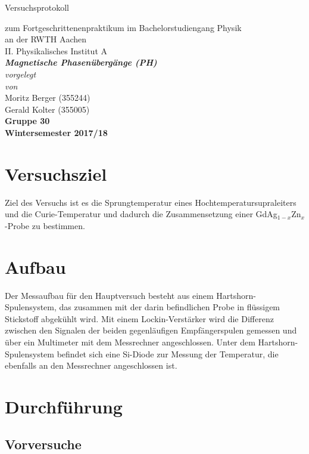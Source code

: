 \documentclass[12pt,a4paper]{article}
\author{Gerald}
\begin{document}
	\setlength{\parindent}{0pt} 
	\begin{center}
		{\LARGE Versuchsprotokoll}\\
		\begin{large}
			zum Fortgeschrittenenpraktikum im Bachelorstudiengang Physik\\[0.4cm]
			an der RWTH Aachen\\
			II. Physikalisches Institut A\\[5.5cm]
			\Large\textbf{\textsl{Magnetische Phasenübergänge (PH)}}\\[5.5cm]
			\normalsize\textit{vorgelegt\\von}\\[0.4cm]
			\large{Moritz Berger (355244)\\Gerald Kolter (355005)}\\\textbf{Gruppe 30}\\[2cm]
			\large \textbf{Wintersemester 2017/18}
		\end{large}
	\end{center}
	\newpage
	
	\tableofcontents
	\newpage

\section{Versuchsziel}
Ziel des Versuchs ist es die Sprungtemperatur eines Hochtemperatursupraleiters und die Curie-Temperatur und dadurch die Zusammensetzung einer GdAg$_{1-x}$Zn$_x$-Probe zu bestimmen.

\section{Aufbau}
Der Messaufbau für den Hauptversuch besteht aus einem Hartshorn-Spulensystem, das zusammen mit der darin befindlichen Probe in flüssigem Stickstoff abgekühlt wird. Mit einem Lockin-Verstärker wird die Differenz zwischen den Signalen der beiden gegenläufigen Empfängerspulen gemessen und über ein Multimeter mit dem Messrechner angeschlossen. Unter dem Hartshorn-Spulensystem befindet sich eine Si-Diode zur Messung der Temperatur, die ebenfalls an den Messrechner angeschlossen ist.

\section{Durchführung}
\subsection{Vorversuche}
\end{document}
